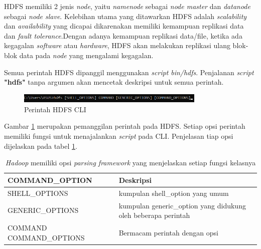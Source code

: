 HDFS memiliki 2 jenis \textit{node}, yaitu \textit{namenode} sebagai \textit{node master} dan \textit{datanode} sebagai \textit{node slave}. Kelebihan utama yang ditawarkan HDFS adalah \textit{scalability} dan \textit{availability} yang dicapai dikarenakan memiliki kemampuan replikasi data dan \textit{fault tolerance}.Dengan adanya kemampuan replikasi data/file, ketika ada kegagalan \textit{software }atau \textit{hardware}, HDFS akan melakukan replikasi ulang blok-blok data pada \textit{node} yang mengalami kegagalan.

Semua perintah HDFS dipanggil menggunakan \textit{script} \textit{bin/hdfs}. Penjalanan \textit{script} \textbf{"hdfs"} tanpa argumen akan mencetak deskripsi untuk semua perintah.
\begin{figure}[H]
	\centering
	\includegraphics[width=0.8\textwidth]{Gambar/hdfs2.png}
	\caption{Perintah HDFS CLI}
	\label{fig:hdfs}
\end{figure}
Gambar \ref{fig:hdfs} merupakan pemanggilan perintah pada HDFS. Setiap opsi perintah memiliki fungsi untuk menajalankan \textit{script} pada CLI. Penjelasan tiap opsi dijelaskan pada tabel \ref{table:command_options}.  

\begin{table}[h]
	\caption{\label{table:command_options}\textit{Hadoop} memiliki opsi \textit{parsing framework} yang menjelaskan setiap fungsi kelasnya }
	\begin{tabular}{|l|l|}
		\hline
		\textbf{COMMAND\_OPTION} & \textbf{Deskripsi}                                            \\ \hline
		SHELL\_OPTIONS           & kumpulan shell\_option  yang umum                             \\ \hline
		GENERIC\_OPTIONS         & kumpulan generic\_option yang didukung oleh beberapa perintah \\ \hline
		COMMAND COMMAND\_OPTIONS & Bermacam perintah dengan opsi                                 \\ \hline
	\end{tabular}
\end{table}
\newpage


